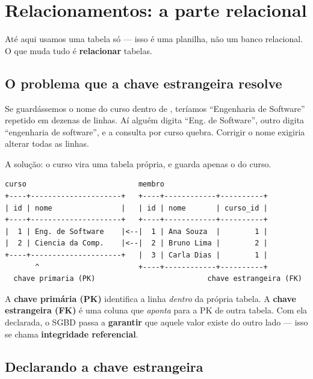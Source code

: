 \chapter{Relacionamentos: a parte relacional}
\label{cap:relacionamentos}

Até aqui usamos uma tabela só --- isso é uma planilha, não um banco relacional.
O que muda tudo é \textbf{relacionar} tabelas.

\section{O problema que a chave estrangeira resolve}

Se guardássemos o nome do curso dentro de , teríamos
``Engenharia de Software'' repetido em dezenas de linhas. Aí alguém digita
``Eng. de Software'', outro digita ``engenharia de software'', e a consulta por
curso quebra. Corrigir o nome exigiria alterar todas as linhas.

A solução: o curso vira uma tabela própria, e  guarda apenas o
 do curso.

\begin{lstlisting}[style=base,caption={Duas tabelas ligadas por chave},label={lst:fk}]
   curso                          membro
+----+---------------------+   +----+------------+----------+
| id | nome                |   | id | nome       | curso_id |
+----+---------------------+   +----+------------+----------+
|  1 | Eng. de Software    |<--|  1 | Ana Souza  |        1 |
|  2 | Ciencia da Comp.    |<--|  2 | Bruno Lima |        2 |
+----+---------------------+   |  3 | Carla Dias |        1 |
       ^                       +----+------------+----------+
  chave primaria (PK)                          chave estrangeira (FK)
\end{lstlisting}

\begin{conceito}[PK e FK]
A \textbf{chave primária (PK)} identifica a linha \emph{dentro} da própria
tabela. A \textbf{chave estrangeira (FK)} é uma coluna que \emph{aponta} para a
PK de outra tabela. Com ela declarada, o SGBD passa a \textbf{garantir} que
aquele valor existe do outro lado --- isso se chama \textbf{integridade
referencial}.
\end{conceito}

\section{Declarando a chave estrangeira}

